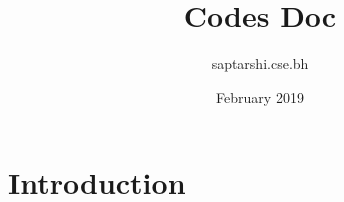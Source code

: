 \documentclass{article}
\title{Codes Doc}
\author{saptarshi.cse.bh }
\date{February 2019}
\begin{document}
\maketitle

\section{Introduction}
\end{document}
